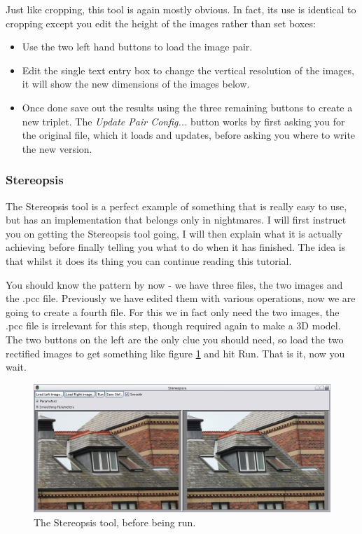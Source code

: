 \documentclass[10pt,a4paper,twoside]{article}
\begin{document}
Just like cropping, this tool is again mostly obvious. In fact, its use is identical to cropping except you edit the height of the images rather than set boxes:
\begin{itemize}
\item Use the two left hand buttons to load the image pair.
\item Edit the single text entry box to change the vertical resolution of the images, it will show the new dimensions of the images below.
\item Once done save out the results using the three remaining buttons to create a new triplet. The \emph{Update Pair Config...} button works by first asking you for the original file, which it loads and updates, before asking you where to write the new version.
\end{itemize}


\subsubsection {Stereopsis}
The Stereopsis tool is a perfect example of something that is really easy to use, but has an implementation that belongs only in nightmares. I will first instruct you on getting the Stereopsis tool going, I will then explain what it is actually achieving before finally telling you what to do when it has finished. The idea is that whilst it does its thing you can continue reading this tutorial.

You should know the pattern by now - we have three files, the two images and the .pcc file. Previously we have edited them with various operations, now we are going to create a fourth file. For this we in fact only need the two images, the .pcc file is irrelevant for this step, though required again to make a 3D model. The two buttons on the left are the only clue you should need, so load the two rectified images to get something like figure \ref{fig:stereo_before} and hit Run. That is it, now you wait.

\begin{figure}
 \centering
 \includegraphics[width=1.0\textwidth]{screenshots/stereo_before}
 \caption{The Stereopsis tool, before being run.}
 \label{fig:stereo_before}
\end{figure}
\end{document}
